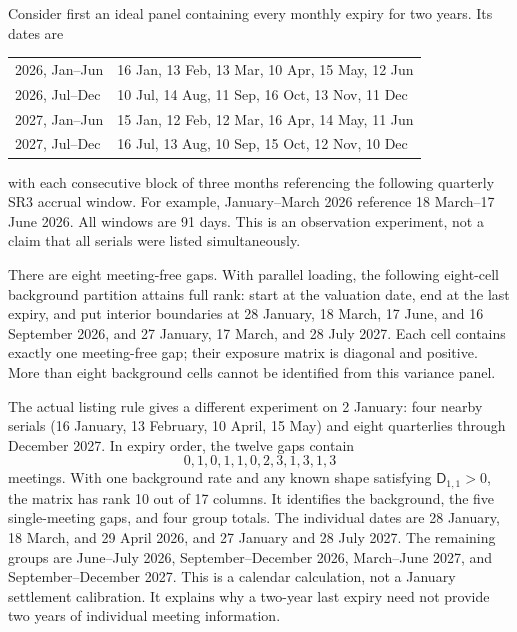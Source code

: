Consider first an ideal panel containing every monthly expiry for two years. Its dates are
\begin{center}\small
\begin{tabular}{ll}
2026, Jan--Jun &16 Jan, 13 Feb, 13 Mar, 10 Apr, 15 May, 12 Jun\\
2026, Jul--Dec &10 Jul, 14 Aug, 11 Sep, 16 Oct, 13 Nov, 11 Dec\\
2027, Jan--Jun &15 Jan, 12 Feb, 12 Mar, 16 Apr, 14 May, 11 Jun\\
2027, Jul--Dec &16 Jul, 13 Aug, 10 Sep, 15 Oct, 12 Nov, 10 Dec
\end{tabular}
\end{center}
with each consecutive block of three months referencing the following quarterly SR3 accrual window. For example, January--March 2026 reference 18 March--17 June 2026. All windows are 91 days. This is an observation experiment, not a claim that all serials were listed simultaneously.

There are eight meeting-free gaps. With parallel loading, the following eight-cell background partition attains full rank: start at the valuation date, end at the last expiry, and put interior boundaries at 28 January, 18 March, 17 June, and 16 September 2026, and 27 January, 17 March, and 28 July 2027. Each cell contains exactly one meeting-free gap; their exposure matrix is diagonal and positive. More than eight background cells cannot be identified from this variance panel.

The actual listing rule \citep{cme2026sr3options} gives a different experiment on 2 January: four nearby serials (16 January, 13 February, 10 April, 15 May) and eight quarterlies through December 2027. In expiry order, the twelve gaps contain
\[
0,1,0,1,1,0,2,3,1,3,1,3
\]
meetings. With one background rate and any known shape satisfying $\mathsf D_{1,1}>0$, the matrix has rank 10 out of 17 columns. It identifies the background, the five single-meeting gaps, and four group totals. The individual dates are 28 January, 18 March, and 29 April 2026, and 27 January and 28 July 2027. The remaining groups are June--July 2026, September--December 2026, March--June 2027, and September--December 2027. This is a calendar calculation, not a January settlement calibration. It explains why a two-year last expiry need not provide two years of individual meeting information.

